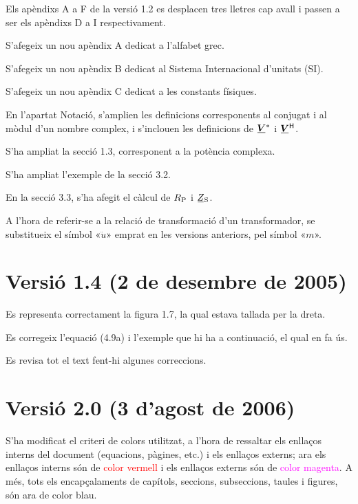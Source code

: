 Els apèndixs A a F de la versió 1.2 es desplacen tres lletres cap
avall i passen a ser els apèndixs D a I respectivament.

S'afegeix un nou apèndix A dedicat a l'alfabet grec.

S'afegeix un nou apèndix B dedicat al Sistema Internacional
d'unitats (SI).

S'afegeix un nou apèndix C dedicat a les constants físiques.

En l'apartat Notació, s'amplien les definicions corresponents al
conjugat i al mòdul d'un nombre complex, i s'inclouen les
definicions de $\mcmplx{V}^*$ i $\hermit{V}$.

S'ha ampliat la secció 1.3, corresponent a la
potència complexa.

 S'ha ampliat l'exemple de la secció 3.2.

En la secció 3.3, s'ha afegit el càlcul de $R_\mathrm{P}$ i
$\cmplx{Z}\ped{S}$.

 A l'hora de referir-se a la
relació de transformació d'un transformador, se substitueix el
símbol «$\ddot{u}$» emprat en les versions anteriors, pel símbol
«$m$».

\section*{Versió 1.4 (2 de desembre de 2005)}

Es representa correctament la figura 1.7, la qual estava
tallada per la dreta.

Es corregeix l'equació (4.9a) i l'exemple que hi
ha a continuació, el qual en fa ús.

Es revisa tot el text fent-hi algunes correccions.

\section*{Versió 2.0 (3 d'agost de 2006)}

S'ha modificat el criteri de colors utilitzat, a l'hora de ressaltar
els enllaços interns del document (equacions, pàgines, etc.) i els
enllaços externs; ara els enllaços interns són de
\textcolor{red}{color vermell} i els enllaços externs són de
\textcolor{magenta}{color magenta}. A més, tots els encapçalaments
de capítols, seccions,
 subseccions, taules  i figures, són ara de
 \textcolor{NavyBlue}{color blau}.

